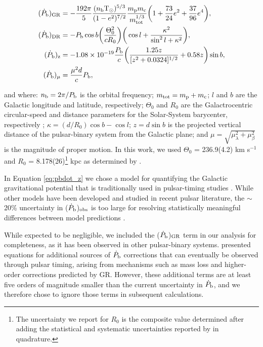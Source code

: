 \documentclass[twocolumn]{aastex63}
\newcommand{\pbdot}{$\dot{P}_{\rm b}$}
\begin{document}
\begin{align}
    \label{eq:pbdot_GR}
    (\dot{P}_{\rm b})_{\rm GR} & = -\frac{192\pi}{5}\frac{(n_{\rm b}{\rm T}_\odot)^{5/3}}{(1-e^2)^{7/2}}\frac{m_{\rm p}m_{\rm c}}{m_{\rm tot}^{1/3}}\bigg(1 + \frac{73}{24}e^2 + \frac{37}{96}e^4\bigg), \\
    \label{eq:pbdot_DR}
    (\dot{P}_{\rm b})_{\rm DR} &= -P_{\rm b}\cos b \bigg(\frac{\Theta_0^2}{cR_0}\bigg)\bigg(\cos l + \frac{\kappa^2}{\sin^2l + \kappa^2}\bigg), \\
    \label{eq:pbdot_z}
    (\dot{P}_{\rm b})_{\rm z} &= -1.08\times10^{-19}\frac{P_{\rm b}}{c}\bigg(\frac{1.25z}{[z^2 + 0.0324]^{1/2}} + 0.58z\bigg)\sin b, \\
    \label{eq:pbdot_mu}
    (\dot{P}_{\rm b})_\mu &= \frac{\mu^2d}{c}P_{\rm b},
\end{align}

\noindent and where: $n_{\rm b} = 2\pi/P_{\rm b}$ is the orbital frequency; $m_{\rm tot} = m_{\rm p} + m_{\rm c}$; $l$ and $b$ are the Galactic longitude and latitude, respectively; $\Theta_0$ and $R_0$ are the Galactrocentric circular-speed and distance parameters for the Solar-System barycenter, respectively \citep[e.g.,][]{rmb+14}; $\kappa = (d/R_0)\cos b - \cos l$; $z = d\sin b$ is the projected vertical distance of the pulsar-binary system from the Galactic plane; and $\mu = \sqrt{\mu_\lambda^2 + \mu_\beta^2}$ is the magnitude of proper motion. In this work, we used $\Theta_0$ = 236.9(4.2) km s$^{-1}$ and $R_0$ = 8.178(26)\footnote{The uncertainty we report for $R_0$ is the composite value determined after adding the statistical and systematic uncertainties reported by \citet{aab+19} in quadrature.} kpc as determined by \citet{aab+19}.

In Equation \ref{eq:pbdot_z} we chose a model for quantifying the Galactic gravitational potential that is traditionally used in pulsar-timing studies \citep{kg89}. While other models have been developed and studied in recent pulsar literature, the $\sim$20\% uncertainty in (\pbdot)$_{\rm obs}$ is too large for resolving statistically meaningful differences between model predictions \citep{pb18}. 

While expected to be negligible, we included the (\pbdot)$_{\rm GR}$ term in our analysis for completeness, as it has been observed in other pulsar-binary systems. \citet{hkw+20} presented equations for additional sources of \pbdot{} corrections that can eventually be observed through pulsar timing, arising from mechanisms such as mass loss and higher-order corrections predicted by GR. However, these additional terms are at least five orders of magnitude smaller than the current uncertainty in \pbdot, and we therefore chose to ignore those terms in subsequent calculations.
\end{document}
